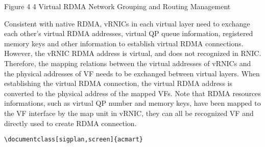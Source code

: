 \documentclass[sigplan,screen]{acmart}
\begin{document}
Figure 4 4 Virtual RDMA Network Grouping and Routing Management

Consistent with native RDMA, vRNICs in each virtual layer need to exchange each other's virtual RDMA addresses, virtual QP queue information, registered memory keys and other information to establish virtual RDMA connections. However, the vRNIC RDMA address is virtual, and does not recognized in RNIC. Therefore, the mapping relations between the virtual addresses of vRNICs and the physical addresses of VF needs to be exchanged between virtual layers. When establishing the virtual RDMA connection, the virtual RDMA address is converted to the physical address of the mapped VFs. Note that RDMA resources informations, such as virtual QP number and memory keys, have been mapped to the VF interface by the map unit in vRNIC, they can all be recognized VF and directly used to create RDMA connection.


\begin{verbatim}
\documentclass[sigplan,screen]{acmart}
\end{verbatim}
\end{document}
